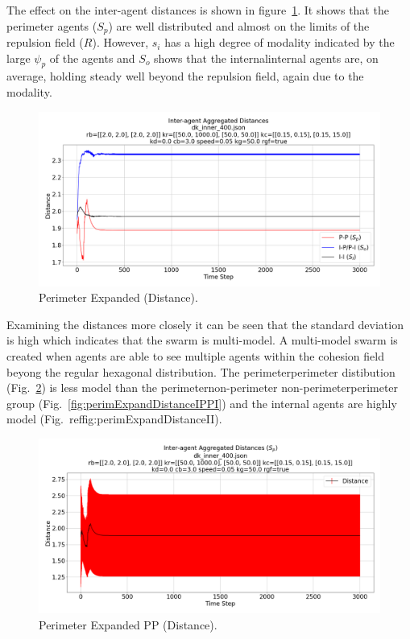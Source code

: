 \documentclass[12pt,a4paper]{IEEEtran}
\newcommand{\rb}{\mathit{R}}
\begin{document}
The effect on the inter-agent distances is shown in figure~\ref{fig:perimExpandDistance}. It shows that the perimeter agents ($S_p$) are well distributed and almost on the limits of the repulsion field ($\rb$). However, $s_i$ has a high degree of modality indicated by the large $\psi_p$ of the agents and $S_o$ shows that the internal\textrightarrow internal agents are, on average, holding steady well beyond the repulsion field, again due to the modality.

\begin{figure}[H]
	\begin{center}
		\includegraphics[width=1.0\linewidth]{figures/innerDistance}
	\end{center}
	\caption{Perimeter Expanded (Distance). \label{fig:perimExpandDistance}}
\end{figure}

Examining the distances more closely it can be seen that the standard deviation is high which indicates that the swarm is multi-model. A multi-model swarm is created when agents are able to see multiple agents within the cohesion field beyong the regular hexagonal distribution. The perimeter\textrightarrow perimeter distibution (Fig.~\ref{fig:perimExpandDistancePP}) is less model than the perimeter\textrightarrow non-perimeter non-perimeter\textrightarrow perimeter group (Fig.~\ref{fig:perimExpandDistanceIPPI}) and the internal agents are highly model (Fig.~ref{fig:perimExpandDistanceII}).

\begin{figure}[H]
	\begin{center}
		\includegraphics[width=1.0\linewidth]{figures/innerDistancePP}
	\end{center}
	\caption{Perimeter Expanded PP (Distance). \label{fig:perimExpandDistancePP}}
\end{figure}
\end{document}
